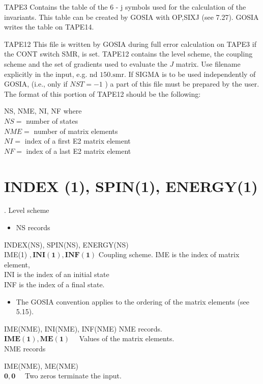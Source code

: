 \documentclass[10pt]{article}
\begin{document}
TAPE3 Contains the table of the 6 - j symbols used for the calculation of the invariants. This table can be created by GOSIA with OP,SIXJ (see 7.27). GOSIA writes the table on TAPE14.

TAPE12 This file is written by GOSIA during full error calculation on TAPE3 if the CONT switch SMR, is set. TAPE12 contains the level scheme, the coupling scheme and the set of gradients used to evaluate the $J$ matrix. Use filename explicitly in the input, e.g. nd $150 . \mathrm{smr}$. If SIGMA is to be used independently of GOSIA, (i.e., only if $N S T=-1$ ) a part of this file must be prepared by the user. The format of this portion of TAPE12 should be the following:

NS, NME, NI, NF where\\
$N S=$ number of states\\
$N M E=$ number of matrix elements\\
$N I=$ index of a first E2 matrix element\\
$N F=$ index of a last E2 matrix element

\section*{INDEX (1), SPIN(1), ENERGY(1)}
. Level scheme

\begin{itemize}
  \item NS records
\end{itemize}

INDEX(NS), SPIN(NS), ENERGY(NS)\\
IME(1) $, \mathbf{I N I}(\mathbf{1}), \mathbf{I N F}(\mathbf{1})$ Coupling scheme. IME is the index of matrix element,\\
INI is the index of an initial state\\
INF is the index of a final state.

\begin{itemize}
  \item The GOSIA convention applies to the ordering of the matrix elements (see 5.15).
\end{itemize}

IME(NME), INI(NME), INF(NME) NME records.\\
$\mathbf{I M E}(\mathbf{1}), \mathbf{M E}(\mathbf{1}) \quad$ Values of the matrix elements.\\
NME records

IME(NME), ME(NME)\\
$\mathbf{0}, \mathbf{0} \quad$ Two zeros terminate the input.
\end{document}
